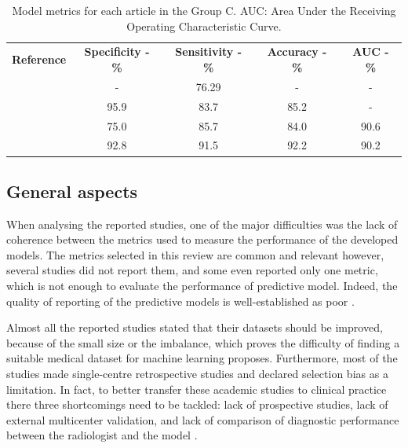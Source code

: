 \documentclass{article}
\begin{document}
\begin{table}[]
    \centering
    \begin{tabular}{ccccc}\toprule
        \multirow{2}{*}{\textbf{Reference}} & \multirow{2}{*}{\textbf{Specificity - \%}} & \multirow{2}{*}{\textbf{Sensitivity - \%}} & \multirow{2}{*}{\textbf{Accuracy - \%}} & \multirow{2}{*}{\textbf{AUC - \%}} \\
        \\\midrule
        \cite{Bi2017}                       & -                                          & 76.29                                      & -                                       & -                                  \\
        \cite{Bi2022}                       & 95.9                                       & 83.7                                       & 85.2                                    & -                                  \\
        \cite{Kong2022}                     & 75.0                                       & 85.7                                       & 84.0                                    & 90.6                               \\
        \cite{Zheng2020}                    & 92.8                                       & 91.5                                       & 92.2                                    & 90.2                               \\
        \bottomrule
    \end{tabular}
    \caption{Model metrics for each article in the Group C. AUC: Area Under the Receiving Operating Characteristic Curve.}
    \label{tab:res_C}
\end{table}

\subsection{General aspects}

When analysing the reported studies, one of the major difficulties was the lack
of coherence between the metrics used to measure the performance of the
developed models. The metrics selected in this review are common and relevant
however, several studies did not report them, and some even reported only one
metric, which is not enough to evaluate the performance of predictive model.
Indeed, the quality of reporting of the predictive models is well-established as
poor \cite{Zhang2022}. 

Almost all the reported studies stated that their datasets should be improved,
because of the small size or the imbalance, which proves the difficulty of
finding a suitable medical dataset for machine learning proposes. Furthermore,
most of the studies made single-centre retrospective studies and declared
selection bias as a limitation. In fact, to better transfer these academic
studies to clinical practice there three shortcomings need to be tackled: lack
of prospective studies, lack of external multicenter validation, and lack of
comparison of diagnostic performance between the radiologist and the model
\cite{Zhang2022}. 
\end{document}
